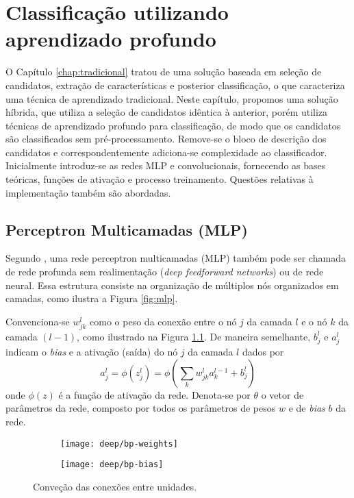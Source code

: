 \chapter{Classificação utilizando aprendizado profundo} \label{chap:class-profundo}
O Capítulo \ref{chap:tradicional} tratou de uma solução baseada em seleção de candidatos, extração de características e posterior classificação, o que caracteriza uma técnica de aprendizado tradicional. Neste capítulo, propomos uma solução híbrida, que utiliza a seleção de candidatos idêntica à anterior, porém utiliza técnicas de aprendizado profundo para classificação, de modo que os candidatos são classificados sem pré-processamento. Remove-se o bloco de descrição dos candidatos e correspondentemente adiciona-se complexidade ao classificador. Inicialmente introduz-se as redes MLP e convolucionais, fornecendo as bases teóricas, funções de ativação e processo treinamento. Questões relativas à implementação também são abordadas.

\section{Perceptron Multicamadas (MLP)}

Segundo \cite{DLbook}, uma rede perceptron multicamadas (MLP) também pode ser chamada de rede profunda sem realimentação (\textit{deep feedforward networks}) ou de rede neural. Essa estrutura consiste na organização de múltiplos nós organizados em camadas, como ilustra a Figura \ref{fig:mlp}. 
 
Convenciona-se $w_{jk}^l$ como o peso da conexão entre o nó $j$ da camada $l$ e o nó $k$ da camada $(l-1)$, como ilustrado na Figura \ref{fig:bp}. De maneira semelhante, $b^l_j$ e $a^l_j$ indicam o \textit{bias} e a ativação (saída) do nó $j$ da camada $l$ dados por
\begin{equation}
a^l_j = \phi (z^l_j) =\phi \left( \sum_k w_{jk}^l a_k^{l-1} + b_j^l \right)
\end{equation}
onde $\phi(z)$ é a função de ativação da rede. Denota-se por $\theta$ o vetor de parâmetros da rede, composto por todos os parâmetros de pesos $w$ e de \textit{bias} $b$ da rede.

\begin{figure}
\centering
\begin{subfigure}{.5\textwidth}
  \centering
  \texttt{[image: deep/bp-weights]}
\end{subfigure}%
\begin{subfigure}{.5\textwidth}
  \centering
  \texttt{[image: deep/bp-bias]}
\end{subfigure}
\caption{Conveção das conexões entre unidades.}
\label{fig:bp}
\end{figure}

